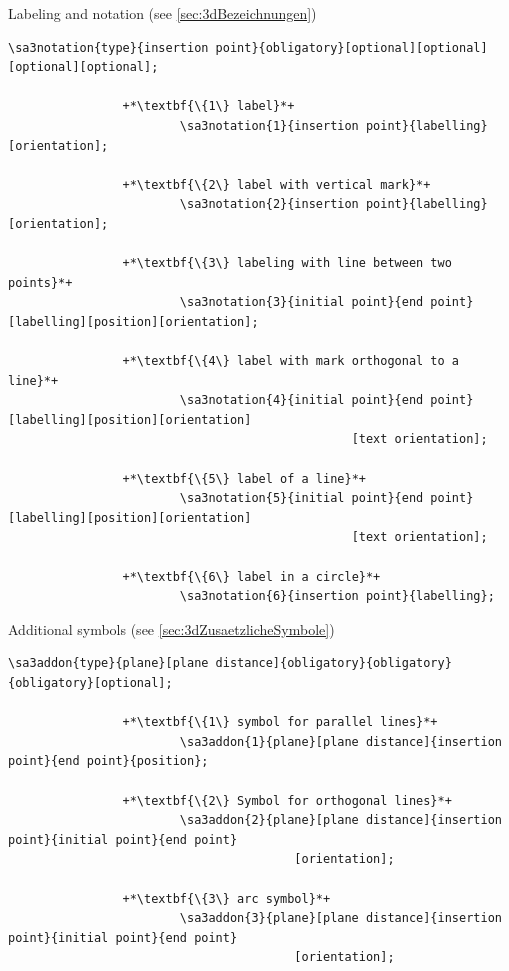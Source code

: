 \documentclass[%
  a4paper,
  BCOR=20mm,
  numbers=noenddot,
  twoside,
  parskip=half,
  openright,
  version=last,
]{scrreprt}
\begin{document}
Labeling and notation (see \ref{sec:3dBezeichnungen})

\begin{lstlisting}[emph={dnotation},backgroundcolor=\color{white}]
		\sa3notation{type}{insertion point}{obligatory}[optional][optional][optional][optional];
		
				+*\textbf{\{1\} label}*+
						\sa3notation{1}{insertion point}{labelling}[orientation];
						
				+*\textbf{\{2\} label with vertical mark}*+
						\sa3notation{2}{insertion point}{labelling}[orientation];
						
				+*\textbf{\{3\} labeling with line between two points}*+
						\sa3notation{3}{initial point}{end point}[labelling][position][orientation];
						
				+*\textbf{\{4\} label with mark orthogonal to a line}*+
						\sa3notation{4}{initial point}{end point}[labelling][position][orientation]
												[text orientation];
						
				+*\textbf{\{5\} label of a line}*+
						\sa3notation{5}{initial point}{end point}[labelling][position][orientation]
												[text orientation];
						
				+*\textbf{\{6\} label in a circle}*+
						\sa3notation{6}{insertion point}{labelling};
\end{lstlisting}\vspace{-10mm}

Additional symbols (see \ref{sec:3dZusaetzlicheSymbole})

\begin{lstlisting}[emph={daddon},backgroundcolor=\color{white}]
		\sa3addon{type}{plane}[plane distance]{obligatory}{obligatory}{obligatory}[optional];
		
				+*\textbf{\{1\} symbol for parallel lines}*+
						\sa3addon{1}{plane}[plane distance]{insertion point}{end point}{position};
						
				+*\textbf{\{2\} Symbol for orthogonal lines}*+
						\sa3addon{2}{plane}[plane distance]{insertion point}{initial point}{end point}
										[orientation];
				
				+*\textbf{\{3\} arc symbol}*+
						\sa3addon{3}{plane}[plane distance]{insertion point}{initial point}{end point}
										[orientation];
\end{lstlisting}\vspace{-10mm}
\end{document}
